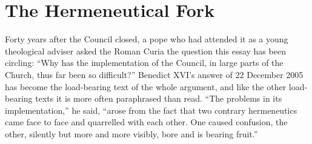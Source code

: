 \section{The Hermeneutical Fork}

Forty years after the Council closed, a pope who had attended it as a young theological adviser asked the Roman Curia the question this essay has been circling: ``Why has the implementation of the Council, in large parts of the Church, thus far been so difficult?'' Benedict XVI's answer of 22 December 2005 has become the load-bearing text of the whole argument, and like the other load-bearing texts it is more often paraphrased than read. ``The problems in its implementation,'' he said, ``arose from the fact that two contrary hermeneutics came face to face and quarrelled with each other. One caused confusion, the other, silently but more and more visibly, bore and is bearing fruit.''

